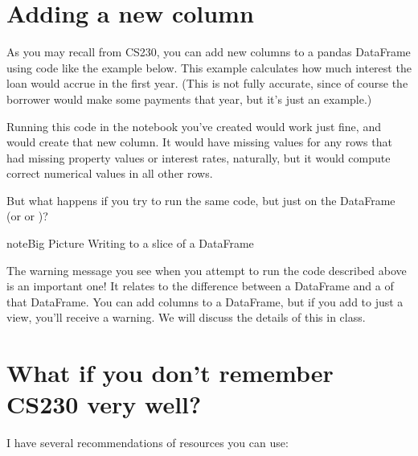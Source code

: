 \documentclass[letterpaper,10pt,english]{jupyterBook}
\begin{document}
\section{Adding a new column}
\label{\detokenize{chapter-4-review-of-python-and-pandas:adding-a-new-column}}
\sphinxAtStartPar
As you may recall from CS230, you can add new columns to a pandas DataFrame using code like the example below.  This example calculates how much interest the loan would accrue in the first year.  (This is not fully accurate, since of course the borrower would make some payments that year, but it’s just an example.)

\begin{sphinxVerbatim}[commandchars=\\\{\}]
\PYG{p}{[}\PYG{p}{]}  \PYG{p}{[}\PYG{p}{]}  \PYG{p}{[}\PYG{p}{]}  
\end{sphinxVerbatim}

\sphinxAtStartPar
Running this code in the notebook you’ve created would work just fine, and would create that new column.  It would have missing values for any rows that had missing property values or interest rates, naturally, but it would compute correct numerical values in all other rows.

\sphinxAtStartPar
But what happens if you try to run the same code, but just on the  DataFrame (or  or )?

\begin{sphinxadmonition}{note}{Big Picture \sphinxhyphen{} Writing to a slice of a DataFrame}

\sphinxAtStartPar
The warning message you see when you attempt to run the code described above is an important one!  It relates to the difference between a DataFrame and a  of that DataFrame.  You can add columns to a DataFrame, but if you add to just a view, you’ll receive a warning.  We will discuss the details of this in class.
\end{sphinxadmonition}


\section{What if you don’t remember CS230 very well?}
\label{\detokenize{chapter-4-review-of-python-and-pandas:what-if-you-don-t-remember-cs230-very-well}}
\sphinxAtStartPar
I have several recommendations of resources you can use:
\end{document}
